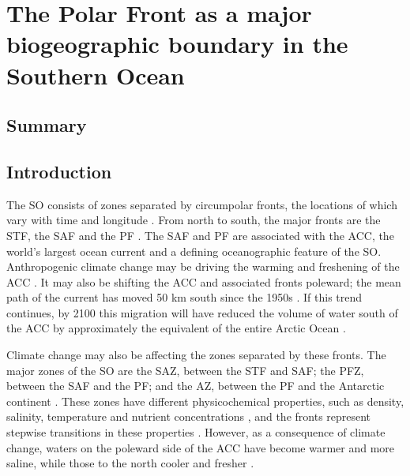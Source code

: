 \chapter{The Polar Front as a major biogeographic boundary in the Southern Ocean} 
\label{ch:polarfront}


\section{Summary}

\section{Introduction}

The \ac{SO} consists of zones separated by circumpolar fronts, the locations of which vary with time and longitude \cite{Whitworth:1980wo,Orsi:1995va,Sokolov:2002tc}.
From north to south, the major fronts are the \ac{STF}, the \ac{SAF} and the \ac{PF} .
The \ac{SAF} and \ac{PF} are associated with the \ac{ACC}, the world's largest ocean current and a defining oceanographic feature of the \ac{SO}.
Anthropogenic climate change may be driving the warming and freshening of the \ac{ACC} \cite{Boning:2008il}.
It may also be shifting the \ac{ACC} and associated fronts poleward; the mean path of the current has moved \textapprox{} 50 km south since the 1950s \cite{Gille:2002fr}.
If this trend continues, by 2100 this migration will have reduced the volume of water south of the \ac{ACC} by approximately the equivalent of the entire Arctic Ocean \cite{Fyfe:2005vp}.

Climate change may also be affecting the zones separated by these fronts.
The major zones of the \ac{SO} are the \ac{SAZ}, between the \ac{STF} and \ac{SAF}; the \ac{PFZ}, between the \ac{SAF} and the \ac{PF}; and the \ac{AZ}, between the \ac{PF} and the Antarctic continent .
These zones have different physicochemical properties, such as density, salinity, temperature and nutrient concentrations \cite{Sokolov:2002tc}, and the fronts represent stepwise transitions in these properties \cite{WhitworthIII:1987ky}.
However, as a consequence of climate change, waters on the poleward side of the \ac{ACC} have become warmer and more saline, while those to the north cooler and fresher \cite{Boning:2008il}.

